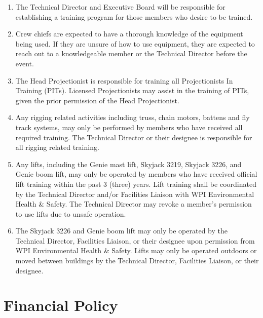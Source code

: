\documentclass[12pt,letterpaper]{book}
\begin{document}
\begin{enumerate}

\item The Technical Director and Executive Board will be responsible for establishing a training program for those members who desire to be trained.
\item Crew chiefs are expected to have a thorough knowledge of the equipment being used. If they are unsure of how to use equipment, they are expected to reach out to a knowledgeable member or the Technical Director before the event.
\item The Head Projectionist is responsible for training all Projectionists In Training (PITs).
Licensed Projectionists may assist in the training of PITs, given the prior permission of the Head Projectionist.
\item Any rigging related activities including truss, chain motors, battens and fly track systems, may only be performed by members who have received all required training. The Technical Director or their designee is responsible for all rigging related training.
\item Any lifts, including the Genie mast lift, Skyjack 3219, Skyjack 3226, and Genie boom lift, may only be operated by members who have received official lift training within the past 3 (three) years. Lift training shall be coordinated by the Technical Director and/or Facilities Liaison with WPI Environmental Health \& Safety. The Technical Director may revoke a member's permission to use lifts due to unsafe operation.
\item The Skyjack 3226 and Genie boom lift may only be operated by the Technical Director, Facilities Liaison, or their designee upon permission from WPI Environmental Health \& Safety. Lifts may only be operated outdoors or moved between buildings by the Technical Director, Facilities Liaison, or their designee.

\end{enumerate}

\section{Financial Policy}
\end{document}
